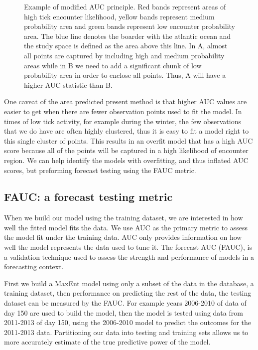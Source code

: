 \noindent 

\begin{figure} [!ht]
\centerline{}
\caption{Example of modified AUC principle. Red bands represent areas of high tick encounter likelihood, yellow bands represent medium probability area and green bands represent low encounter probability area. The blue line denotes the boarder with the atlantic ocean and the study space is defined as the area above this line. In A, almost all points are captured by including high and medium probability areas while in B we need to add a significant chunk of low probability area in order to enclose all points. Thus, A will have a higher AUC statistic than B. }
\label{fig6}
\end{figure}

\noindent One caveat of the area predicted present method is that higher AUC values are easier to get when there are fewer observation points used to fit the model. In times of low tick activity, for example during the winter, the few observations that we do have are often highly clustered, thus it is easy to fit a model right to this single cluster of points. This results in an overfit model that has a high AUC score because all of the points will be captured in a high likelihood of encounter region. We can help identify the models with overfitting, and thus inflated AUC scores, but preforming forecast testing using the FAUC metric. 

\subsection{FAUC: a forecast testing metric}

When we build our model using the training dataset, we are interested in how well the fitted model fits the data. We use AUC as the primary metric to assess the model fit under the training data. AUC only provides information on how well the model represents the data used to tune it. The forecast AUC (FAUC), is a validation technique used to assess the strength and performance of models in a forecasting context. \newline

\noindent First we build a MaxEnt model using only a subset of the data in the database, a training dataset, then performance on predicting the rest of the data, the testing dataset can be measured by the FAUC. For example years 2006-2010 of data of day 150 are used to build the model, then the model is tested using data from 2011-2013 of day 150, using the 2006-2010 model to predict the outcomes for the 2011-2013 data. Partitioning our data into testing and training sets allows us to more accurately estimate of the true predictive power of the model. 


